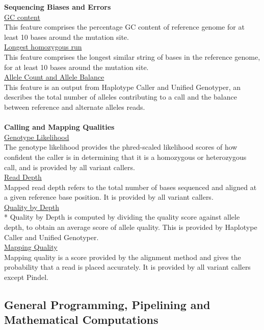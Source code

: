 \documentclass{article}
\begin{document}
\textbf{Sequencing Biases and Errors} \\[0.3\baselineskip]
\underline{GC content}\\
This feature comprises the percentage GC content of reference genome for at least 10 bases around the mutation site.\\[0.3\baselineskip]
\underline{Longest homozygous run}\\
This feature comprises the longest similar string of bases in the reference genome, for at least 10 bases around the mutation site.\\[0.3\baselineskip]
\underline{Allele Count and Allele Balance}\\
This feature is an output from Haplotype Caller and Unified Genotyper, an describes the total number of alleles contributing to a call and the balance between reference and alternate alleles reads.\\\\
\textbf{Calling and Mapping Qualities} \\[0.3\baselineskip]
\underline{Genotype Likelihood}\\
The genotype likelihood provides the phred-scaled likelihood scores of how confident the caller is in determining that it is a homozygous or heterozygous call, and is provided by all variant callers.\\[0.3\baselineskip]
\underline{Read Depth}\\
Mapped read depth refers to the total number of bases sequenced and aligned at a given reference base position. It is provided by all variant callers.\\[0.3\baselineskip]
\underline{Quality by Depth}\\*
Quality by Depth is computed by dividing the quality score against allele depth, to obtain an average score of allele quality. This is provided by Haplotype Caller and Unified Genotyper.\\[0.3\baselineskip]
\underline{Mapping Quality}\\
Mapping quality is a score provided by the alignment method and gives the probability that a read is placed accurately. It is provided by all variant callers except Pindel.\\

\subsection{General Programming, Pipelining and Mathematical Computations}
\end{document}
